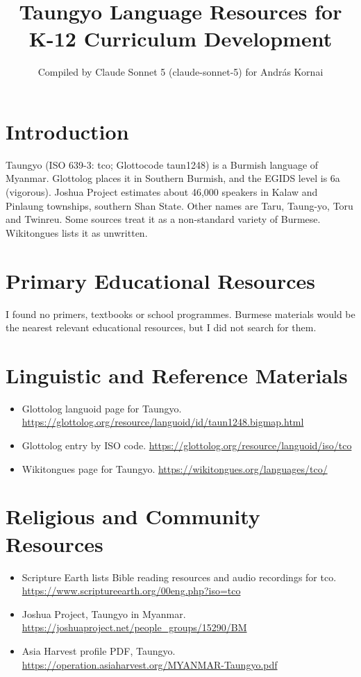 \documentclass[12pt]{article}
\title{Taungyo Language Resources for K-12 Curriculum Development}
\author{Compiled by Claude Sonnet 5 (claude-sonnet-5) for Andr\'as Kornai}
\date{}
\begin{document}
\maketitle
\section{Introduction}
Taungyo (ISO 639-3: tco; Glottocode taun1248) is a Burmish language of Myanmar. Glottolog places it in Southern Burmish, and the EGIDS level is 6a (vigorous). Joshua Project estimates about 46,000 speakers in Kalaw and Pinlaung townships, southern Shan State. Other names are Taru, Taung-yo, Toru and Twinreu. Some sources treat it as a non-standard variety of Burmese. Wikitongues lists it as unwritten.
\section{Primary Educational Resources}
I found no primers, textbooks or school programmes. Burmese materials would be the nearest relevant educational resources, but I did not search for them.
\section{Linguistic and Reference Materials}
\begin{itemize}
\item Glottolog languoid page for Taungyo. \url{https://glottolog.org/resource/languoid/id/taun1248.bigmap.html}
\item Glottolog entry by ISO code. \url{https://glottolog.org/resource/languoid/iso/tco}
\item Wikitongues page for Taungyo. \url{https://wikitongues.org/languages/tco/}
\end{itemize}
\section{Religious and Community Resources}
\begin{itemize}
\item Scripture Earth lists Bible reading resources and audio recordings for tco. \url{https://www.scriptureearth.org/00eng.php?iso=tco}
\item Joshua Project, Taungyo in Myanmar. \url{https://joshuaproject.net/people_groups/15290/BM}
\item Asia Harvest profile PDF, Taungyo. \url{https://operation.asiaharvest.org/MYANMAR-Taungyo.pdf}
\end{itemize}
\end{document}
